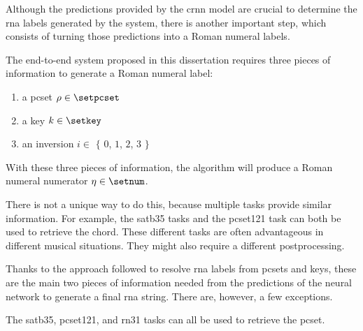 
Although the predictions provided by the \gls{crnn} model
are crucial to determine the \gls{rna} labels generated by
the system, there is another important step, which consists
of turning those predictions into a Roman numeral labels.

The end-to-end system proposed in this dissertation requires
three pieces of information to generate a Roman numeral
label:
\begin{enumerate}
    \item a \gls{pcset} $\rho \in \setpcset$
    \item a key $k \in \setkey$
    \item an inversion $i \in$ $\{$ $0$, $1$, $2$, $3$ $\}$
\end{enumerate}

With these three pieces of information, the \algorithmrn{}
algorithm will produce a Roman numeral numerator $\eta \in
\setnum$.

There is not a unique way to do this, because multiple tasks
provide similar information. For example, the \gls{satb35}
tasks and the \gls{pcset121} task can both be used to
retrieve the chord. These different tasks are often
advantageous in different musical situations. They might
also require a different postprocessing.

Thanks to the approach followed to resolve \gls{rna} labels
from \gls{pcset}s and keys, these are the main two pieces of
information needed from the predictions of the neural
network to generate a final \gls{rna} string. There are,
however, a few exceptions.

The \gls{satb35}, \gls{pcset121}, and \gls{rn31} tasks can
all be used to retrieve the \gls{pcset}.




